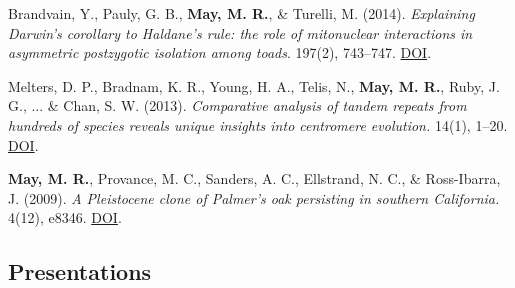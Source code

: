 \begin{etaremune}[topsep=0pt,itemsep=1.2em,partopsep=0pt,parsep=0pt]
    \item Brandvain, Y., Pauly, G. B., \textbf{May, M. R.}, \& Turelli, M. (2014). \textit{Explaining Darwin’s corollary to Haldane’s rule: the role of mitonuclear interactions in asymmetric postzygotic isolation among toads}.  197(2), 743–747. \href{https://doi.org/10.1534/genetics.113.161133}{DOI}.
    \item Melters, D. P., Bradnam, K. R., Young, H. A., Telis, N., \textbf{May, M. R.}, Ruby, J. G., ... \& Chan, S. W. (2013). \textit{Comparative analysis of tandem repeats from hundreds of species reveals unique insights into centromere evolution.}  14(1), 1–20. \href{https://genomebiology.biomedcentral.com/articles/10.1186/gb-2013-14-1-r10}{DOI}.
    \item \textbf{May, M. R.}, Provance, M. C., Sanders, A. C., Ellstrand, N. C., \& Ross-Ibarra, J. (2009). \textit{A Pleistocene clone of Palmer's oak persisting in southern California.}  4(12), e8346. \href{https://journals.plos.org/plosone/article?id=10.1371/journal.pone.0008346}{DOI}.
\end{etaremune}



\subsection*{Presentations}

